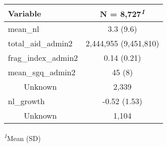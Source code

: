 \begin{table}[!t]
\fontsize{12.0pt}{14.4pt}\selectfont
\begin{tabular*}{\linewidth}{@{\extracolsep{\fill}}lc}
\toprule
\textbf{Variable} & \textbf{N = 8,727}\textsuperscript{\textit{1}} \\ 
\midrule\addlinespace[2.5pt]
mean\_nl & 3.3 (9.6) \\ 
total\_aid\_admin2 & 2,444,955 (9,451,810) \\ 
frag\_index\_admin2 & 0.14 (0.21) \\ 
mean\_sgq\_admin2 & 45 (8) \\ 
    Unknown & 2,339 \\ 
nl\_growth & -0.52 (1.53) \\ 
    Unknown & 1,104 \\ 
\bottomrule
\end{tabular*}
\begin{minipage}{\linewidth}
\textsuperscript{\textit{1}}Mean (SD)\\
\end{minipage}
\end{table}

